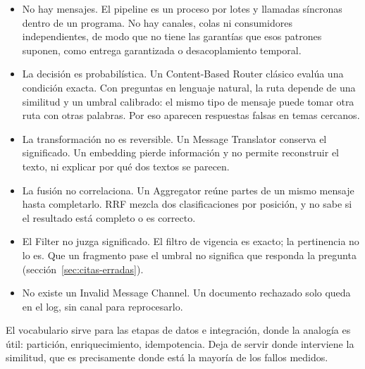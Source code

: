\begin{itemize}
  \item No hay mensajes. El pipeline es un proceso por lotes y llamadas síncronas dentro de un programa. No hay canales, colas ni consumidores independientes, de modo que no tiene las garantías que esos patrones suponen, como entrega garantizada o desacoplamiento temporal.
  \item La decisión es probabilística. Un Content-Based Router clásico evalúa una condición exacta. Con preguntas en lenguaje natural, la ruta depende de una similitud y un umbral calibrado: el mismo tipo de mensaje puede tomar otra ruta con otras palabras. Por eso aparecen respuestas falsas en temas cercanos.
  \item La transformación no es reversible. Un Message Translator conserva el significado. Un embedding pierde información y no permite reconstruir el texto, ni explicar por qué dos textos se parecen.
  \item La fusión no correlaciona. Un Aggregator reúne partes de un mismo mensaje hasta completarlo. RRF mezcla dos clasificaciones por posición, y no sabe si el resultado está completo o es correcto.
  \item El Filter no juzga significado. El filtro de vigencia es exacto; la pertinencia no lo es. Que un fragmento pase el umbral no significa que responda la pregunta (sección~\ref{sec:citas-erradas}).
  \item No existe un Invalid Message Channel. Un documento rechazado solo queda en el log, sin canal para reprocesarlo.
\end{itemize}

El vocabulario sirve para las etapas de datos e integración, donde la analogía es útil: partición, enriquecimiento, idempotencia. Deja de servir donde interviene la similitud, que es precisamente donde está la mayoría de los fallos medidos.
